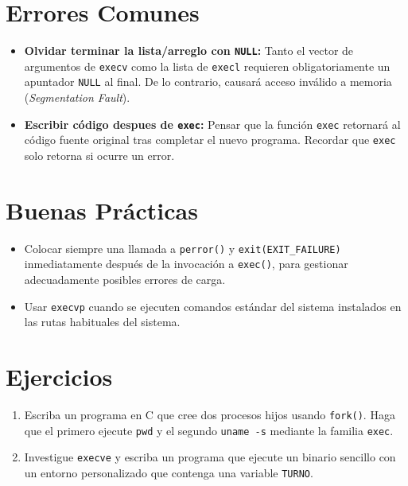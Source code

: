 \documentclass[12pt,a4paper]{article}
\begin{document}
\section{Errores Comunes}
\begin{itemize}
    \item \textbf{Olvidar terminar la lista/arreglo con \texttt{NULL}:} Tanto el vector de argumentos de \texttt{execv} como la lista de \texttt{execl} requieren obligatoriamente un apuntador \texttt{NULL} al final. De lo contrario, causará acceso inválido a memoria (\textit{Segmentation Fault}).
    \item \textbf{Escribir código despues de \texttt{exec}:} Pensar que la función \texttt{exec} retornará al código fuente original tras completar el nuevo programa. Recordar que \texttt{exec} solo retorna si ocurre un error.
\end{itemize}

\section{Buenas Prácticas}
\begin{itemize}
    \item Colocar siempre una llamada a \texttt{perror()} y \texttt{exit(EXIT\_FAILURE)} inmediatamente después de la invocación a \texttt{exec()}, para gestionar adecuadamente posibles errores de carga.
    \item Usar \texttt{execvp} cuando se ejecuten comandos estándar del sistema instalados en las rutas habituales del sistema.
\end{itemize}

\section{Ejercicios}
\begin{enumerate}
    \item Escriba un programa en C que cree dos procesos hijos usando \texttt{fork()}. Haga que el primero ejecute \texttt{pwd} y el segundo \texttt{uname -s} mediante la familia \texttt{exec}.
    \item Investigue \texttt{execve} y escriba un programa que ejecute un binario sencillo con un entorno personalizado que contenga una variable \texttt{TURNO}.
\end{enumerate}
\end{document}
